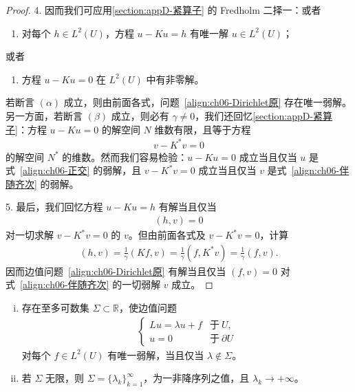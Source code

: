 \documentclass[../../main.tex]{subfiles}
\begin{document}
\begin{proof}
4. 因而我们可应用\cref{section:appD-紧算子} 的 Fredholm 二择一：或者
\begin{enumerate}[$(\alpha)$]
\item 对每个 $h\in L^{2}(U)$，方程 $u-Ku=h$ 有唯一解 $u\in L^{2}(U)$；
\end{enumerate}
或者
\begin{enumerate}[$(\beta)$]
\item 方程 $u-Ku=0$ 在 $L^{2}(U)$ 中有非零解。
\end{enumerate}
若断言 $(\alpha)$ 成立，则由前面各式，问题~\eqref{align:ch06-Dirichlet原} 存在唯一弱解。另一方面，若断言 $(\beta)$ 成立，则必有 $\gamma\neq 0$，我们还回忆\cref{section:appD-紧算子}：方程 $u-Ku=0$ 的解空间 $N$ 维数有限，且等于方程
\begin{align}
v-K^{*}v=0
\end{align}
的解空间 $N^{*}$ 的维数。然而我们容易检验：$u-Ku=0$ 成立当且仅当 $u$ 是式~\eqref{align:ch06-正交} 的弱解，且 $v-K^{*}v=0$ 成立当且仅当 $v$ 是式~\eqref{align:ch06-伴随齐次} 的弱解。

5. 最后，我们回忆方程 $u-Ku=h$ 有解当且仅当
\begin{align*}
(h,v)=0
\end{align*}
对一切求解 $v-K^{*}v=0$ 的 $v$。但由前面各式及 $v-K^{*}v=0$，计算
\begin{align*}
(h,v)=\frac{1}{\gamma}(Kf,v)=\frac{1}{\gamma}(f,K^{*}v)=\frac{1}{\gamma}(f,v).
\end{align*}
因而边值问题~\eqref{align:ch06-Dirichlet原} 有解当且仅当 $(f,v)=0$ 对式~\eqref{align:ch06-伴随齐次} 的一切弱解 $v$ 成立。
\end{proof}

\begin{theorem}[弱解的第三存在定理]\label{theorem:ch06-第三存在定理}
\begin{enumerate}[(i)]
\item 存在至多可数集 $\Sigma\subset\mathbb{R}$，使边值问题
\begin{align}
\begin{cases}
Lu=\lambda u+f & \text{于}\ U,\\
u=0 & \text{于}\ \partial U
\end{cases}
\label{align:ch06-更高边界问题}
\end{align}
对每个 $f\in L^{2}(U)$ 有唯一弱解，当且仅当 $\lambda\notin\Sigma$。
\item 若 $\Sigma$ 无限，则 $\Sigma=\{\lambda_{k}\}_{k=1}^{\infty}$，为一非降序列之值，且 $\lambda_{k}\to+\infty$。
\end{enumerate}
\end{theorem}
\end{document}
